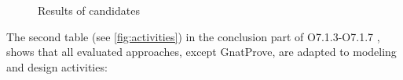  \begin{figure}
  \centering
  \caption{Results of candidates}
  \label{fig:results}
\end{figure}

The second table (see \ref{fig:activities}) in the conclusion part of O7.1.3-O7.1.7 \citep{WP7_O713_O717}, shows that all evaluated approaches, except GnatProve, are adapted to modeling and design activities:

